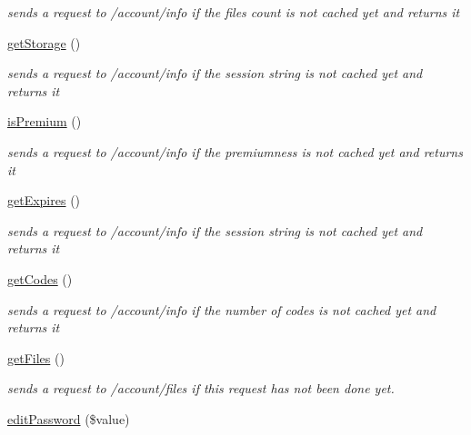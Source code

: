 \begin{DoxyCompactItemize}
\begin{DoxyCompactList}\small\item\em sends a request to /account/info if the files count is not cached yet and returns it \end{DoxyCompactList}\item 
\hyperlink{classAccount_acead8f2ef19395aeae6a8ab94e21e50b}{getStorage} ()
\begin{DoxyCompactList}\small\item\em sends a request to /account/info if the session string is not cached yet and returns it \end{DoxyCompactList}\item 
\hypertarget{classAccount_af1c983ce957b5e181633c2aff278d15f}{
\hyperlink{classAccount_af1c983ce957b5e181633c2aff278d15f}{isPremium} ()}
\label{classAccount_af1c983ce957b5e181633c2aff278d15f}

\begin{DoxyCompactList}\small\item\em sends a request to /account/info if the premiumness is not cached yet and returns it \end{DoxyCompactList}\item 
\hypertarget{classAccount_a5f7f8ff34b4befbf757455e8011d1832}{
\hyperlink{classAccount_a5f7f8ff34b4befbf757455e8011d1832}{getExpires} ()}
\label{classAccount_a5f7f8ff34b4befbf757455e8011d1832}

\begin{DoxyCompactList}\small\item\em sends a request to /account/info if the session string is not cached yet and returns it \end{DoxyCompactList}\item 
\hypertarget{classAccount_a84a49c7e2888e8cff244e25e1901d5d3}{
\hyperlink{classAccount_a84a49c7e2888e8cff244e25e1901d5d3}{getCodes} ()}
\label{classAccount_a84a49c7e2888e8cff244e25e1901d5d3}

\begin{DoxyCompactList}\small\item\em sends a request to /account/info if the number of codes is not cached yet and returns it \end{DoxyCompactList}\item 
\hyperlink{classAccount_aa0dc98ce30abcd3d1a73c1a3e123a544}{getFiles} ()
\begin{DoxyCompactList}\small\item\em sends a request to /account/files if this request has not been done yet. \end{DoxyCompactList}\item 
\hypertarget{classAccount_a6a7ff1d886d9eb0894a71481912a59e5}{
\hyperlink{classAccount_a6a7ff1d886d9eb0894a71481912a59e5}{editPassword} (\$value)}
\label{classAccount_a6a7ff1d886d9eb0894a71481912a59e5}


\end{DoxyCompactItemize}
